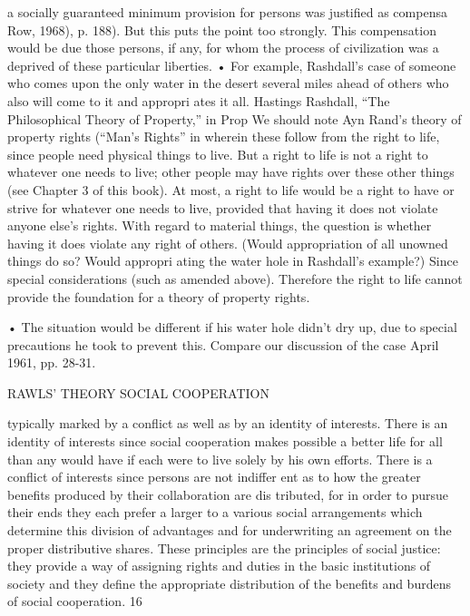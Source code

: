 \documentclass[11pt,openany]{book}
\begin{document}
{a socially guaranteed minimum provision for persons was justified as compensa Row, 1968), p. 188). But this puts the point too strongly. This compensation would be due those persons, if any, for whom the process of civilization was a deprived of these particular liberties. • For example, Rashdall's case of someone who comes upon the only water in the desert several miles ahead of others who also will come to it and appropri ates it all. Hastings Rashdall, ``The Philosophical Theory of Property,'' in Prop We should note Ayn Rand's theory of property rights (``Man's Rights'' in wherein these follow from the right to life, since people need physical things to live. But a right to life is not a right to whatever one needs to live; other people may have rights over these other things (see Chapter 3 of this book). At most, a right to life would be a right to have or strive for whatever one needs to live, provided that having it does not violate anyone else's rights. With regard to material things, the question is whether having it does violate any right of others. (Would appropriation of all unowned things do so? Would appropri ating the water hole in Rashdall's example?) Since special considerations (such as amended above). Therefore the right to life cannot provide the foundation for a theory of property rights.\par

• The situation would be different if his water hole didn't dry up, due to special precautions he took to prevent this. Compare our discussion of the case April 1961, pp. 28-31.\par

RAWLS' THEORY SOCIAL COOPERATION\par

typically marked by a conflict as well as by an identity of interests. There is an identity of interests since social cooperation makes possible a better life for all than any would have if each were to live solely by his own efforts. There is a conflict of interests since persons are not indiffer ent as to how the greater benefits produced by their collaboration are dis tributed, for in order to pursue their ends they each prefer a larger to a various social arrangements which determine this division of advantages and for underwriting an agreement on the proper distributive shares. These principles are the principles of social justice: they provide a way of assigning rights and duties in the basic institutions of society and they define the appropriate distribution of the benefits and burdens of social cooperation. 16\par

}
\end{document}
